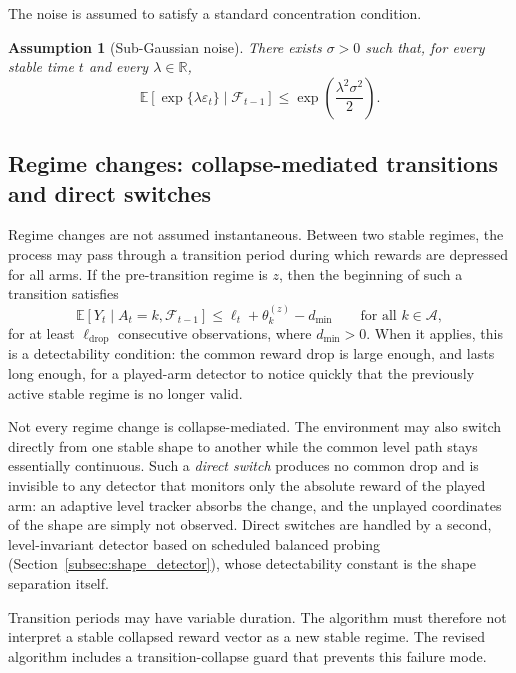 \documentclass[11pt]{article}
\newtheorem{assumption}{Assumption}
\newcommand{\A}{\mathcal A}
\newcommand{\F}{\mathcal F}
\newcommand{\E}{\mathbb E}
\newcommand{\R}{\mathbb R}
\begin{document}
The noise is assumed to satisfy a standard concentration condition.

\begin{assumption}[Sub-Gaussian noise]
\label{ass:subgaussian}
There exists $\sigma>0$ such that, for every stable time $t$ and every $\lambda\in\R$,
\begin{equation}
\label{eq:subgaussian}
\E\left[
\exp\{\lambda\varepsilon_t\}
\mid \F_{t-1}
\right]
\leq
\exp\left(\frac{\lambda^2\sigma^2}{2}\right).
\end{equation}
\end{assumption}

\subsection{Regime changes: collapse-mediated transitions and direct switches}
\label{subsec:transitions}

Regime changes are not assumed instantaneous. Between two stable regimes, the process may pass through a transition period during which rewards are depressed for all arms. If the pre-transition regime is $z$, then the beginning of such a transition satisfies
\begin{equation}
\label{eq:drop_condition}
\E[Y_t\mid A_t=k,\F_{t-1}]
\leq
\ell_t+\theta_k^{(z)}-d_{\min}
\qquad \text{for all } k\in\A,
\end{equation}
for at least $\ell_{\mathrm{drop}}$ consecutive observations, where $d_{\min}>0$. When it applies, this is a detectability condition: the common reward drop is large enough, and lasts long enough, for a played-arm detector to notice quickly that the previously active stable regime is no longer valid.

Not every regime change is collapse-mediated. The environment may also switch directly from one stable shape to another while the common level path stays essentially continuous. Such a \emph{direct switch} produces no common drop and is invisible to any detector that monitors only the absolute reward of the played arm: an adaptive level tracker absorbs the change, and the unplayed coordinates of the shape are simply not observed. Direct switches are handled by a second, level-invariant detector based on scheduled balanced probing (Section~\ref{subsec:shape_detector}), whose detectability constant is the shape separation itself.

Transition periods may have variable duration. The algorithm must therefore not interpret a stable collapsed reward vector as a new stable regime. The revised algorithm includes a transition-collapse guard that prevents this failure mode.
\end{document}
